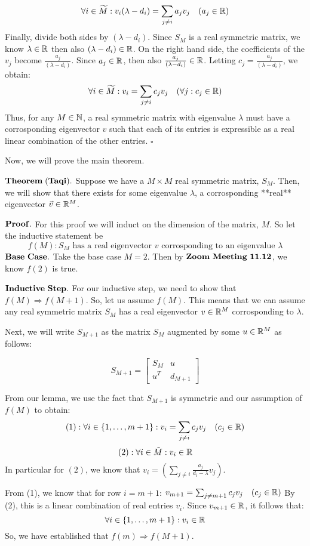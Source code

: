 $$\forall i \in \widetilde{M} :  v_i(\lambda - d_i) = \sum_{j \neq i} a_jv_j \quad (a_j \in \mathbb{R})$$
Finally, divide both sides by $(\lambda - d_i)$. Since $S_M$ is a real symmetric matrix, we know $\lambda \in \mathbb{R}$ then also $(\lambda - d_i) \in \mathbb{R}$. On the right hand side, the coefficients of the $v_j$ become $\frac{a_j}{(\lambda - d_i)}$. Since $a_j \in \mathbb{R}$, then also $\frac{a_j}{(\lambda - d_i)} \in \mathbb{R}$. Letting $c_j = \frac{a_j}{(\lambda - d_i)}$, we obtain:
$$\forall i \in \widetilde{M}: v_i =  {\sum_{j \neq i} c_j v_j} \quad (\forall j: c_j \in \mathbb{R})$$
Thus, for any $M \in \mathbb{N}$, a real symmetric matrix with eigenvalue $\lambda$ must have a corrosponding eigenvector $v$ such that each of its entries is expressible as a real linear combination of the other entries. $\square$

Now, we will prove the main theorem.

$\bf Theorem \; (Taqi).$ Suppose we have a $M \times M$ real symmetric matrix, $S_M$. Then, we will show that there exists for some eigenvalue $\lambda$, a corrosponding **real** eigenvector $\vec{v} \in \mathbb{R}^M$.

$\bf Proof.$ For this proof we will induct on the dimension of the matrix, $M$. So let the inductive statement be
$$f(M) : S_M\text{ has a real eigenvector } v \text{ corrosponding to an eigenvalue } \lambda$$
$\bf Base \,\, Case.$ Take the base case $M = 2$. Then by $\bf Zoom \,\,Meeting\,\, 11.12$, we know $f(2)$ is true.

$\bf Inductive \,\, Step.$ For our inductive step, we need to show that $f(M) \Rightarrow f(M+1)$. So, let us assume $f(M)$. This means that we can assume any real symmetric matrix $S_M$ has a real eigenvector $v \in \mathbb{R}^M$ corrosponding to $\lambda$.

Next, we will write $S_{M+1}$ as the matrix $S_M$ augmented by some $u \in \mathbb{R}^M$ as follows:

$$ S_{M+1} =
\left[
  \begin{array}{c|c}
  S_M & u\\ 
  \hline
  u^T & d_{M+1} 
\end{array} \right]$$

From our lemma, we use the fact that $S_{M+1}$ is symmetric and our assumption of $f(M)$ to obtain:
$$(1): \forall i \in \{1,\dots,m+1\}: v_i =  {\sum_{j \neq i} c_j v_j} \quad (c_j \in \mathbb{R})$$
$$(2): \forall i \in \tilde{M} : v_i \in \mathbb{R}$$
In particular for $(2)$, we know that $v_i = \left({\sum_{j \neq i} \frac{a_j}{d_i-\lambda} v_j}\right)$.


From (1), we know that for row $i = m+1$:
$v_{m+1} =  {\sum_{j \neq {m+1}} c_j v_j} \quad (c_j \in \mathbb{R})$
By (2), this is a linear combination of real entries $v_i$. Since $v_{m+1} \in \mathbb{R}$, it follows that:
$$\forall i \in \{1,\dots,m+1\}: v_i \in \mathbb{R}$$
So, we have established that $f(m) \Rightarrow f(M+1)$.

